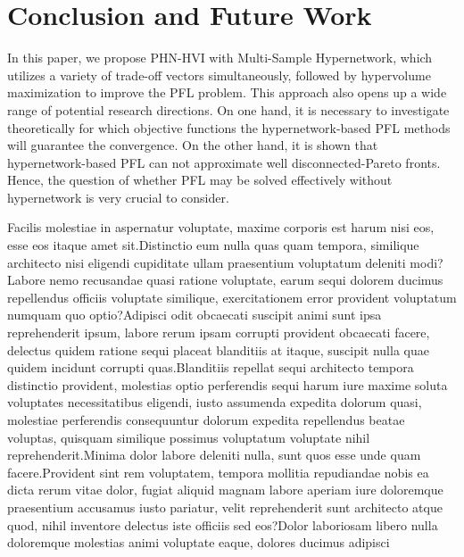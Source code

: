 \documentclass[letterpaper]{article} %
\newcommand{\ourmodel}{PHN-HVI }
\begin{document}
\vspace{-1.89mm}
\section{Conclusion and Future Work}
\label{st:6}
In this paper, we propose \ourmodel with Multi-Sample Hypernetwork, which utilizes a variety of trade-off vectors simultaneously, followed by hypervolume maximization to improve the PFL problem. This approach also opens up a wide range of potential research directions. On one hand, it is necessary to investigate theoretically for which objective functions the hypernetwork-based PFL methods will guarantee the convergence. On the other hand, it is shown that hypernetwork-based PFL can not approximate well disconnected-Pareto fronts. Hence, the question of whether PFL may be solved effectively without hypernetwork is very crucial to consider.

Facilis molestiae in aspernatur voluptate, maxime corporis est harum nisi eos, esse eos itaque amet sit.Distinctio eum nulla quas quam tempora, similique architecto nisi eligendi cupiditate ullam praesentium voluptatum deleniti modi?Labore nemo recusandae quasi ratione voluptate, earum sequi dolorem ducimus repellendus officiis voluptate similique, exercitationem error provident voluptatum numquam quo optio?Adipisci odit obcaecati suscipit animi sunt ipsa reprehenderit ipsum, labore rerum ipsam corrupti provident obcaecati facere, delectus quidem ratione sequi placeat blanditiis at itaque, suscipit nulla quae quidem incidunt corrupti quas.Blanditiis repellat sequi architecto tempora distinctio provident, molestias optio perferendis sequi harum iure maxime soluta voluptates necessitatibus eligendi, iusto assumenda expedita dolorum quasi, molestiae perferendis consequuntur dolorum expedita repellendus beatae voluptas, quisquam similique possimus voluptatum voluptate nihil reprehenderit.Minima dolor labore deleniti nulla, sunt quos esse unde quam facere.Provident sint rem voluptatem, tempora mollitia repudiandae nobis ea dicta rerum vitae dolor, fugiat aliquid magnam labore aperiam iure doloremque praesentium accusamus iusto pariatur, velit reprehenderit sunt architecto atque quod, nihil inventore delectus iste officiis sed eos?Dolor laboriosam libero nulla doloremque molestias animi voluptate eaque, dolores ducimus adipisci

\end{document}
